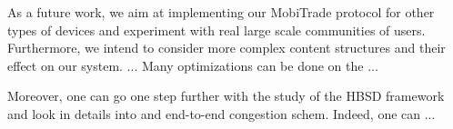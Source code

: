 As a future work, we aim at implementing our MobiTrade protocol for other types of devices and experiment with real large scale communities of users. Furthermore, we intend to consider more complex content structures and their effect on our system. ... Many optimizations can be done on the ... 

Moreover, one can go one step further with the study of the HBSD framework and look in details into and end-to-end congestion schem. Indeed, one can ...

